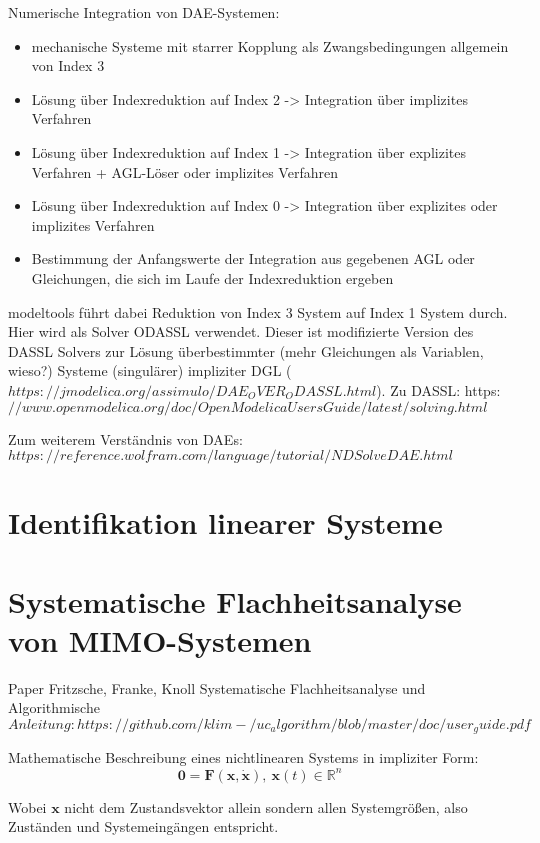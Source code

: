 Numerische Integration von DAE-Systemen: 
\begin{itemize}
\item mechanische Systeme mit starrer Kopplung als Zwangsbedingungen allgemein von Index 3
\item Lösung über Indexreduktion auf Index 2 -> Integration über implizites Verfahren
\item Lösung über Indexreduktion auf Index 1 -> Integration über explizites Verfahren + AGL-Löser oder implizites Verfahren
\item Lösung über Indexreduktion auf Index 0 -> Integration über explizites oder implizites Verfahren
\item Bestimmung der Anfangswerte der Integration aus gegebenen AGL oder Gleichungen, die sich im Laufe der Indexreduktion ergeben
\end{itemize}

modeltools führt dabei Reduktion von Index 3 System auf Index 1 System durch.
Hier wird als Solver ODASSL verwendet. Dieser ist modifizierte Version des DASSL Solvers zur Lösung überbestimmter (mehr Gleichungen als Variablen, wieso?) Systeme (singulärer) impliziter DGL ($https://jmodelica.org/assimulo/DAE_OVER_ODASSL.html$). Zu DASSL: https:$//www.openmodelica.org/doc/OpenModelicaUsersGuide/latest/solving.html$

Zum weiterem Verständnis von DAEs: $https://reference.wolfram.com/language/tutorial/NDSolveDAE.html$

\section{Identifikation linearer Systeme}

\section{Systematische Flachheitsanalyse von MIMO-Systemen}
Paper Fritzsche, Franke, Knoll Systematische Flachheitsanalyse und Algorithmische $Anleitung: https://github.com/klim-/uc_algorithm/blob/master/doc/user_guide.pdf$

Mathematische Beschreibung eines nichtlinearen Systems in impliziter Form:
\begin{equation}\label{eq:flatness_implicit_ode}
	\pmb{0} = \pmb{F}(\pmb{x}, \pmb{\dot{x}}), \ \pmb{x}(t) \in \mathbb{R}^n
\end{equation}

Wobei $\pmb{x}$ nicht dem Zustandsvektor allein sondern allen Systemgrößen, also Zuständen und Systemeingängen entspricht.

